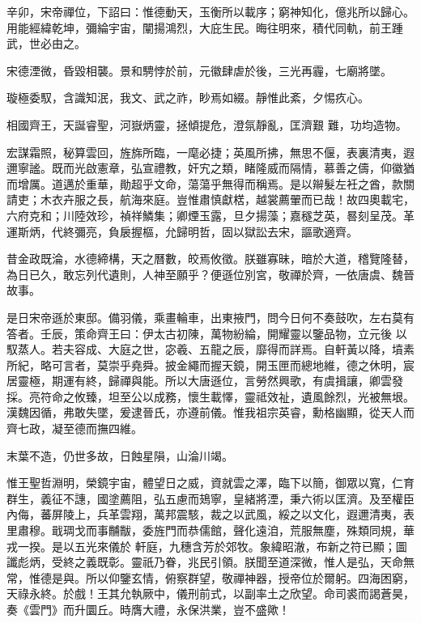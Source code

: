 \begin{pinyinscope}
 辛卯，宋帝禪位，下詔曰：惟德動天，玉衡所以載序；窮神知化，億兆所以歸心。用能經緯乾坤，彌綸宇宙，闡揚鴻烈，大庇生民。晦往明來，積代同軌，前王踵武，世必由之。



 宋德湮微，昏毀相襲。景和騁悖於前，元徽肆虐於後，三光再霾，七廟將墜。



 璇極委馭，含識知泯，我文、武之祚，眇焉如綴。靜惟此紊，夕惕疚心。



 相國齊王，天誕睿聖，河嶽炳靈，拯傾提危，澄氛靜亂，匡濟艱
 難，功均造物。



 宏謀霜照，秘算雲回，旌旆所臨，一麾必捷；英風所拂，無思不偃，表裏清夷，遐邇寧謐。既而光啟憲章，弘宣禮教，奸宄之類，睹隆威而隔情，慕善之儔，仰徽猶而增厲。道邁於重華，勛超乎文命，蕩蕩乎無得而稱焉。是以辮髮左衽之酋，款關請吏；木衣卉服之長，航海來庭。豈惟肅慎獻楛，越裳薦翬而已哉！故四奧載宅，六府克和；川陸效珍，禎祥鱗集；卿煙玉露，旦夕揚藻；嘉穟芝英，晷刻呈茂。革運斯炳，代終彌亮，負扆握樞，允歸明哲，固以獄訟去宋，謳歌適齊。



 昔金政既淪，水德締構，天之曆數，皎焉攸徵。朕雖寡昧，暗於大道，稽覽隆替，為日已久，敢忘列代遺則，人神至願乎？便遜位別宮，敬禪於齊，一依唐虞、魏晉故事。



 是日宋帝遜於東邸。備羽儀，乘畫輪車，出東掖門，問今日何不奏鼓吹，左右莫有答者。壬辰，策命齊王曰：伊太古初陳，萬物紛綸，開耀靈以鑒品物，立元後
 以馭蒸人。若夫容成、大庭之世，宓羲、五龍之辰，靡得而詳焉。自軒黃以降，墳素所紀，略可言者，莫崇乎堯舜。披金繩而握天鏡，開玉匣而總地維，德之休明，宸居靈極，期運有終，歸禪與能。所以大唐遜位，言勞然興歌，有虞揖讓，卿雲發採。亮符命之攸臻，坦至公以成務，懷生載懌，靈祗效祉，遺風餘烈，光被無垠。漢魏因循，弗敢失墜，爰逮晉氏，亦遵前儀。惟我祖宗英睿，勳格幽顯，從天人而齊七政，凝至德而撫四維。



 末葉不造，仍世多故，日蝕星隕，山淪川竭。



 惟王聖哲淵明，榮鏡宇宙，體望日之威，資就雲之澤，臨下以簡，御眾以寬，仁育群生，義征不譓，國塗薦阻，弘五慮而鳷寧，皇緒將湮，秉六術以匡濟。及至權臣內侮，蕃屏陵上，兵革雲翔，萬邦震駭，裁之以武風，綏之以文化，遐邇清夷，表里肅穆。戢琱戈而事黼黻，委旌門而恭儒館，聲化遠洎，荒服無塵，殊類同規，華戎一揆。是以五光來儀於
 軒庭，九穗含芳於郊牧。象緯昭澈，布新之符已顯；圖讖彪炳，受終之義既彰。靈祇乃眷，兆民引領。朕聞至道深微，惟人是弘，天命無常，惟德是與。所以仰鑒玄情，俯察群望，敬禪神器，授帝位於爾躬。四海困窮，天祿永終。於戲！王其允執厥中，儀刑前式，以副率土之欣望。命司裘而謁蒼昊，奏《雲門》而升圜丘。時膺大禮，永保洪業，豈不盛歟！




\end{pinyinscope}
